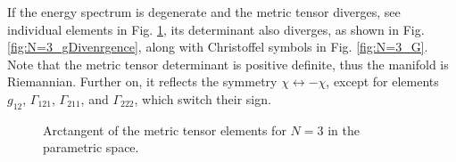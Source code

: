 If the energy spectrum is degenerate and the metric tensor diverges, see individual elements in Fig. \ref{fig:N=3_g}, its determinant also diverges, as shown in Fig. \ref{fig:N=3_gDivenrgence}, along with Christoffel symbols in Fig. \ref{fig:N=3_G}. Note that the metric tensor determinant is positive definite, thus the manifold is Riemannian. Further on, it reflects the symmetry $\chi\leftrightarrow-\chi$, except for elements $g_{12}$, $\Gamma_{121}$, $\Gamma_{211}$, and $\Gamma_{222}$, which switch their sign.

\begin{figure}[H]
    \centering
\caption{Arctangent of the metric tensor elements for $N=3$ in the parametric space.}
    \label{fig:N=3_g}
\end{figure}

